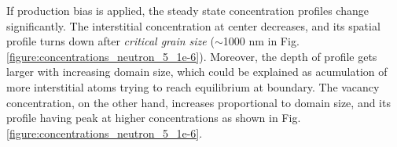 \documentclass[a4paper]{article}
\begin{document}
    \newpage
     If production bias is applied, the steady state concentration profiles change significantly. The interstitial concentration at center decreases, and its spatial profile turns down after \textit{critical grain size} (${\sim}$1000 nm in Fig. \ref{figure:concentrations_neutron_5_1e-6}). Moreover, the depth of profile gets larger with increasing domain size, which could be explained as acumulation of more interstitial atoms trying to reach equilibrium at boundary. The vacancy concentration, on the other hand, increases proportional to domain size, and its profile having peak at higher concentrations as shown in Fig. \ref{figure:concentrations_neutron_5_1e-6}.\\
    \begin{figure}[h!]  %
      \centering
      \qquad

\end{figure}
\end{document}
